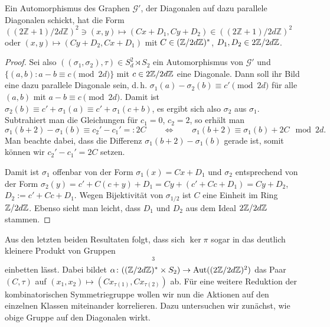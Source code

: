 \begin{lemma}
Ein Automorphismus des Graphen $\mathcal G'$, der Diagonalen auf dazu parallele Diagonalen schickt, hat die Form $((2\mathbb Z+1)/2d\mathbb Z)^2 \ni (x,y) \mapsto (Cx+D_1, Cy+D_2) \in ((2\mathbb Z+1)/2d\mathbb Z)^2$ oder $(x,y) \mapsto (Cy+D_2, Cx+D_1)$ mit $C \in (\Zmod 2dZ)^*$, $D_1, D_2 \in 2\Zmod 2dZ$.
\end{lemma}
\begin{proof}
Sei also $((\sigma_1, \sigma_2), \tau) \in S_d^2 \rtimes S_2$ ein Automorphismus von $\mathcal G'$ und $\{(a,b) : a-b \equiv c \pmod{2d}\}$ mit $c \in 2\Zmod 2dZ$ eine Diagonale. Dann soll ihr Bild eine dazu parallele Diagonale sein, d.\,h. $\sigma_1(a) - \sigma_2(b) \equiv c' \pmod{2d}$ für alle $(a,b)$ mit $a-b \equiv c \pmod{2d}$. Damit ist $\sigma_2(b) \equiv c' + \sigma_1(a) \equiv c' + \sigma_1(c+b)$, es ergibt sich also $\sigma_2$ aus $\sigma_1$. Subtrahiert man die Gleichungen für $c_1=0$, $c_2=2$, so erhält man
\begin{equation*}
\sigma_1(b+2) - \sigma_1(b) \equiv c_2' - c_1' =: 2C \qquad\Longleftrightarrow\qquad \sigma_1(b+2) \equiv \sigma_1(b) + 2C  \mod{2d}.
\end{equation*}
Man beachte dabei, dass die Differenz $\sigma_1(b+2) - \sigma_1(b)$ gerade ist, somit können wir $c_2' - c_1' = 2C$ setzen.

Damit ist $\sigma_1$ offenbar von der Form $\sigma_1(x) = Cx+D_1$ und $\sigma_2$ entsprechend von der Form $\sigma_2(y) = c' + C(c+y) + D_1 = Cy + (c'+Cc+D_1) = Cy + D_2$, $D_2 := c'+Cc+D_1$. Wegen Bijektivität von $\sigma_{1/2}$ ist $C$ eine Einheit im Ring $\Zmod 2dZ$. Ebenso sieht man leicht, dass $D_1$ und $D_2$ aus dem Ideal $2\Zmod 2dZ$ stammen.
\end{proof}

Aus den letzten beiden Resultaten folgt, dass sich $\ker \pi$ sogar in das deutlich kleinere Produkt von Gruppen
\begin{equation*}
[(2\Zmod 2dZ)^2 \rtimes_\alpha ((\Zmod 2dZ)^* \times S_2)]^3
\end{equation*}
einbetten lässt. Dabei bildet $\alpha \colon ((\Zmod 2dZ)^* \times S_2) \to \Aut ((2\Zmod 2dZ)^2)$ das Paar $(C,\tau)$ auf $(x_1,x_2) \mapsto (Cx_{\tau(1)},Cx_{\tau(2)})$ ab. Für eine weitere Reduktion der kombinatorischen Symmetriegruppe wollen wir nun die Aktionen auf den einzelnen Klassen miteinander korrelieren. Dazu untersuchen wir zunächst, wie obige Gruppe auf den Diagonalen wirkt.

